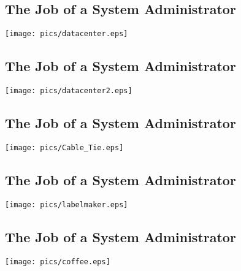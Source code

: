 \documentclass[xga]{xdvislides}
\begin{document}
\subsection{The Job of a System Administrator}
\vspace*{\fill}
\begin{center}
	\texttt{[image: pics/datacenter.eps]} \\
\end{center}
\vspace*{\fill}

\subsection{The Job of a System Administrator}
\vspace*{\fill}
\begin{center}
	\texttt{[image: pics/datacenter2.eps]} \\
\end{center}
\vspace*{\fill}

\subsection{The Job of a System Administrator}
\vspace*{\fill}
\begin{center}
	\texttt{[image: pics/Cable\_Tie.eps]} \\
\end{center}
\vspace*{\fill}

\subsection{The Job of a System Administrator}
\vspace*{\fill}
\begin{center}
	\texttt{[image: pics/labelmaker.eps]} \\
\end{center}
\vspace*{\fill}

\subsection{The Job of a System Administrator}
\vspace*{\fill}
\begin{center}
	\texttt{[image: pics/coffee.eps]} \\
\end{center}
\vspace*{\fill}
\end{document}
